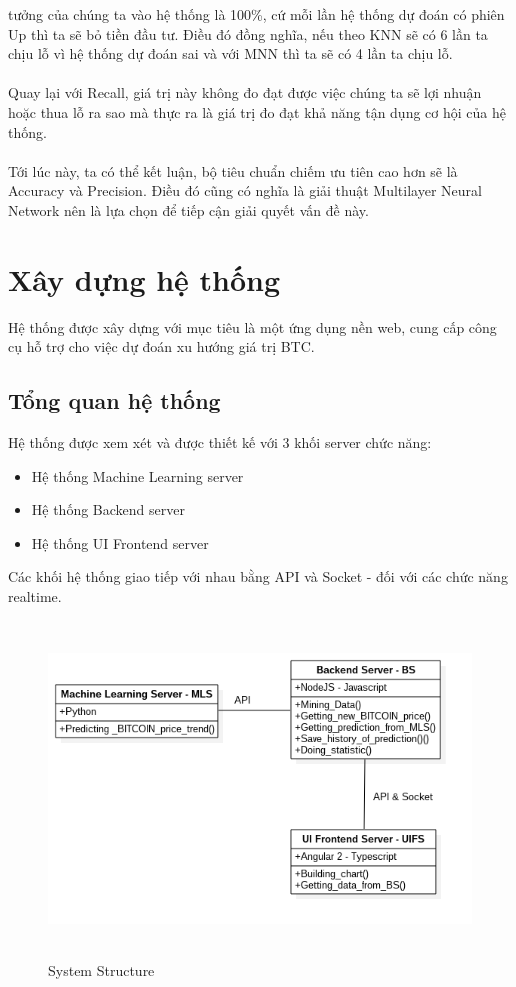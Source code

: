 tưởng của chúng ta vào hệ thống là 100\%, cứ mỗi lần hệ thống dự đoán có phiên Up 
thì ta sẽ bỏ tiền đầu tư. Điều đó đồng nghĩa, nếu theo KNN sẽ có 6 lần ta chịu 
lỗ vì hệ thống dự đoán sai và với MNN thì ta sẽ có 4 lần ta chịu lỗ.\\\\
Quay lại với Recall, giá trị này không đo đạt được việc chúng ta sẽ lợi nhuận 
hoặc thua lỗ ra sao mà thực ra là giá trị đo đạt khả năng tận dụng cơ hội của hệ 
thống.\\\\
Tới lúc này, ta có thể kết luận, bộ tiêu chuẩn chiếm ưu tiên cao hơn sẽ là Accuracy 
và Precision. Điều đó cũng có nghĩa là giải thuật Multilayer Neural Network nên 
là lựa chọn để tiếp cận giải quyết vấn đề này.
\section{Xây dựng hệ thống}
Hệ thống được xây dựng với mục tiêu là một ứng dụng nền web, cung cấp công cụ hỗ 
trợ cho việc dự đoán xu hướng giá trị BTC.
\subsection{Tổng quan hệ thống}
Hệ thống được xem xét và được thiết kế với 3 khối server chức năng:
\begin{itemize}
\item Hệ thống Machine Learning server
\item Hệ thống Backend server
\item Hệ thống UI Frontend server
\end{itemize}
Các khối hệ thống giao tiếp với nhau bằng API và Socket - đối với các chức năng
realtime.\\
\begin{figure}[h!]
\centering
\includegraphics[height=3.5in, keepaspectratio=true]{system.png}
\caption{System Structure}
\end{figure}\\
